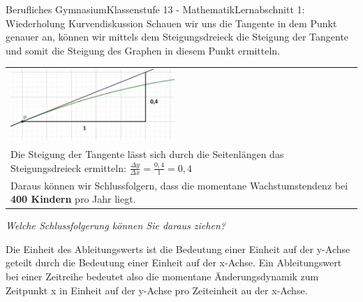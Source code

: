\documentclass[11pt,twocolumn,oneside,openany,headings=optiontotoc,11pt,numbers=noenddot]{article}
\begin{document}
\begin{worksheet}{Berufliches Gymnasium}{Klassenstufe 13 - Mathematik}{Lernabschnitt 1: Wiederholung Kurvendiskussion}
		Schauen wir uns die Tangente in dem Punkt genauer an, können wir mittels dem Steigungsdreieck die Steigung der Tangente und somit die Steigung des Graphen in diesem Punkt ermitteln.\\
		\par\bigskip\noindent
		\begin{tabularx}{0.48\textwidth}{X}
			\includegraphics[width=0.48\textwidth]{../99_Bilder/00_Wdh/KiTa2.png}\\
			Die Steigung der Tangente lässt sich durch die Seitenlängen das Steigungsdreieck ermitteln: \(\frac{\Delta{}y}{\Delta{}x}= \frac{0,4}{1} = 0,4\)\\
			Daraus können wir Schlussfolgern, dass die momentane Wachstumstendenz bei \textbf{400 Kindern} pro Jahr liegt.\\
		\end{tabularx}
		\par\bigskip\noindent
		\textit{Welche Schlussfolgerung können Sie daraus ziehen?}\\
		\par\bigskip\noindent
		\begin{framed}
			Die Einheit des Ableitungswerts ist die Bedeutung einer Einheit auf der y-Achse geteilt durch die Bedeutung einer Einheit auf der x-Achse. Ein Ableitungswert bei einer Zeitreihe bedeutet also die momentane Änderungsdynamik zum Zeitpunkt x in \glqq{}Einheit auf der y-Achse\grqq{} pro \glqq{}Zeiteinheit au der x-Achse\grqq{}.
		\end{framed}

\end{worksheet}
\end{document}
